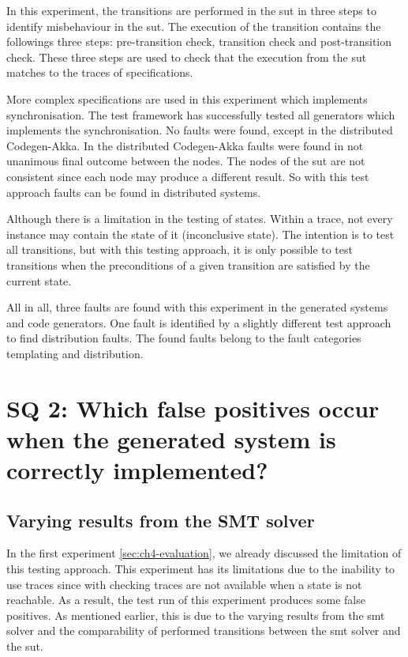 In this experiment, the transitions are performed in the \gls{sut} in three
steps to identify misbehaviour in the \gls{sut}. The execution of the transition
contains the followings three steps: pre-transition check, transition check and
post-transition check. These three steps are used to check that the execution
from the \gls{sut} matches to the traces of specifications.

More complex specifications are used in this experiment which implements
synchronisation. The test framework has successfully tested all generators which
implements the synchronisation. No faults were found, except in the distributed
Codegen-Akka. In the distributed Codegen-Akka faults were found in not unanimous
final outcome between the nodes. The nodes of the \gls{sut} are not consistent
since each node may produce a different result. So with this test approach
faults can be found in distributed systems.

Although there is a limitation in the testing of states. Within a trace, not
every instance may contain the state of it (inconclusive state).
The intention is to test all transitions,
but with this testing approach, it is only possible to test
transitions when the preconditions of a given transition are satisfied by the
current state.

All in all, three faults are found with this experiment in the generated systems
and code generators. One fault is identified by a slightly different test approach
to find distribution faults. The found faults belong to the fault categories
templating and distribution.

\section{SQ 2: Which false positives occur when the generated system is correctly implemented?}

\subsection{Varying results from the SMT solver}
In the first experiment \autoref{sec:ch4-evaluation}, we already discussed the limitation of this
testing approach. This experiment has its limitations due to the inability to
use traces since with checking traces are not available when a state is not
reachable. As a result, the test run of this experiment produces some false
positives. As mentioned earlier, this is due to the varying results from the
\gls{smt} solver and the comparability of performed transitions between the
\gls{smt} solver and the \gls{sut}.

